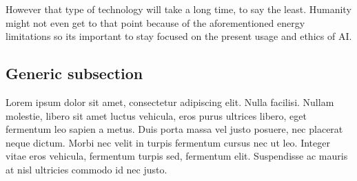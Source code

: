 \documentclass[letterpaper,11pt,leqno]{article}
\begin{document}
However that type of technology will take a long time, to say the least. Humanity might not even get to that point because of the aforementioned energy limitations so its important to stay focused on the present usage and ethics of AI. 

\subsection{Generic subsection}

Lorem ipsum dolor sit amet, consectetur adipiscing elit. Nulla facilisi. Nullam molestie, libero sit amet luctus vehicula, eros purus ultrices libero, eget fermentum leo sapien a metus. Duis porta massa vel justo posuere, nec placerat neque dictum. Morbi nec velit in turpis fermentum cursus nec ut leo. Integer vitae eros vehicula, fermentum turpis sed, fermentum elit. Suspendisse ac mauris at nisl ultricies commodo id nec justo. 

\pagebreak

\printbibliography
\end{document}
